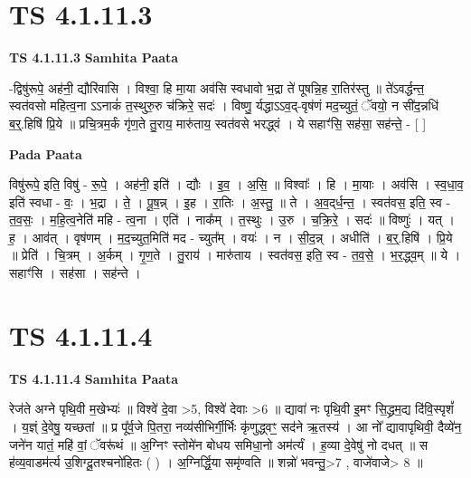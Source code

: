 \documentclass[17pt]{extarticle}
\begin{document}
\section*{ TS 4.1.11.3 }

\textbf{TS 4.1.11.3 } \newline
\textbf{Samhita Paata} \newline

-द्विषु॑रूपे॒ अह॑नी॒ द्यौरि॑वासि । विश्वा॒ हि मा॒या अव॑सि स्वधावो भ॒द्रा ते॑ पूषन्नि॒ह रा॒तिर॑स्तु ॥ ते॑ऽवर्द्धन्त॒ स्वत॑वसो महित्व॒ना ऽऽनाकं॑ त॒स्थुरु॒रु च॑क्रिरे॒ सदः॑ । विष्णु॒ र्यद्धाऽऽव॒द्-वृष॑णं मद॒च्युतं॒ ॅवयो॒ न सी॑द॒न्नधि॑ ब॒र्॒.हिषि॑ प्रि॒ये ॥ प्रचि॒त्रम॒र्कं गृ॑ण॒ते तु॒राय॒ मारु॑ताय॒ स्वत॑वसे भरद्ध्वं । ये सहाꣳ॑सि॒ सह॑सा॒ सह॑न्ते॒ - [  ] \newline

\textbf{Pada Paata} \newline

विषु॑रूपे॒ इति॒ विषु॑ - रू॒पे॒ । अह॑नी॒ इति॑ । द्यौः । इ॒व॒ । अ॒सि॒ ॥ विश्वाः᳚ । हि । मा॒याः । अव॑सि । स्व॒धा॒व॒ इति॑ स्वधा - वः॒ । भ॒द्रा । ते॒ । पू॒ष॒न्न् । इ॒ह । रा॒तिः । अ॒स्तु॒ ॥ ते । अ॒व॒द्‌र्ध॒न्त॒ । स्वत॑वस॒ इति॒ स्व - त॒व॒सः॒ । म॒हि॒त्व॒नेति॑ महि - त्व॒ना । एति॑ । नाक᳚म् । त॒स्थुः । उ॒रु । च॒क्रि॒रे॒ । सदः॑ ॥ विष्णुः॑ । यत् । ह॒ । आव॑त् । वृष॑णम् । म॒द॒च्युत॒मिति॑ मद - च्युत᳚म् । वयः॑ । न । सी॒द॒न्न् । अधीति॑ । ब॒र्॒.हिषि॑ । प्रि॒ये ॥ प्रेति॑ । चि॒त्रम् । अ॒र्कम् । गृ॒ण॒ते । तु॒राय॑ । मारु॑ताय । स्वत॑वस॒ इति॒ स्व - त॒व॒से॒ । भ॒र॒द्ध्व॒म् ॥ ये । सहाꣳ॑सि । सह॑सा । सह॑न्ते ।  \newline




\section*{ TS 4.1.11.4 }

\textbf{TS 4.1.11.4 } \newline
\textbf{Samhita Paata} \newline

रेज॑ते अग्ने पृथि॒वी म॒खेभ्यः॑ ॥ विश्वे॑ दे॒वा >5, विश्वे॑ देवाः >6 ॥ द्यावा॑ नः पृथि॒वी इ॒मꣳ सि॒द्ध्रम॒द्य दि॑वि॒स्पृशं᳚ । य॒ज्ञ्ं दे॒वेषु॒ यच्छतां ॥ प्र पू᳚र्व॒जे पि॒तरा॒ नव्य॑सीभिर्गी॒र्भिः कृ॑णुद्ध्वꣳ॒॒ सद॑ने ऋ॒तस्य॑ । आ नो᳚ द्यावापृथिवी॒ दैव्ये॑न॒ जने॑न यातं॒ महि॑ वां॒ ॅवरू॑थं ॥ अ॒ग्निꣳ स्तोमे॑न बोधय समिधा॒नो अम॑र्त्यं । ह॒व्या दे॒वेषु॑ नो दधत् ॥ स ह॑व्य॒वाडम॑र्त्य उ॒शिग्दू॒तश्चनो॑हितः ( ) । अ॒ग्निर्द्धि॒या समृ॑ण्वति ॥ शन्नो॑ भवन्तु॒>7 , वाजे॑वाजे> 8 ॥ \newline
\end{document}
